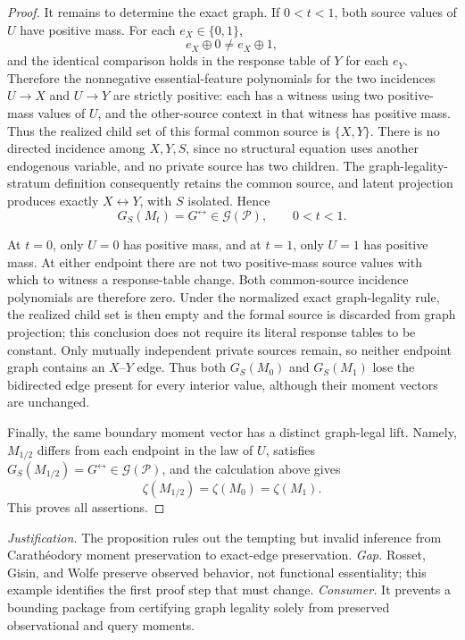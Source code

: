 \documentclass{article}
\begin{document}
\begin{proof}
It remains to determine the exact graph.  If \(0<t<1\), both source values of \(U\) have positive mass.  For each \(e_X\in\{0,1\}\),
\[
 e_X\oplus0\ne e_X\oplus1,
\]
and the identical comparison holds in the response table of \(Y\) for each \(e_Y\).  Therefore the nonnegative essential-feature polynomials for the two incidences \(U\to X\) and \(U\to Y\) are strictly positive: each has a witness using two positive-mass values of \(U\), and the other-source context in that witness has positive mass.  Thus the realized child set of this formal common source is \(\{X,Y\}\).  There is no directed incidence among \(X,Y,S\), since no structural equation uses another endogenous variable, and no private source has two children.  The graph-legality-stratum definition consequently retains the common source, and latent projection produces exactly \(X\leftrightarrow Y\), with \(S\) isolated.  Hence
\[
 G_S(M_t)=G^{\leftrightarrow}\in\mathcal G(\mathcal P),
 \qquad 0<t<1.
\]

At \(t=0\), only \(U=0\) has positive mass, and at \(t=1\), only \(U=1\) has positive mass.  At either endpoint there are not two positive-mass source values with which to witness a response-table change.  Both common-source incidence polynomials are therefore zero.  Under the normalized exact graph-legality rule, the realized child set is then empty and the formal source is discarded from graph projection; this conclusion does not require its literal response tables to be constant.  Only mutually independent private sources remain, so neither endpoint graph contains an \(X\)--\(Y\) edge.  Thus both \(G_S(M_0)\) and \(G_S(M_1)\) lose the bidirected edge present for every interior value, although their moment vectors are unchanged.

Finally, the same boundary moment vector has a distinct graph-legal lift.  Namely, \(M_{1/2}\) differs from each endpoint in the law of \(U\), satisfies \(G_S(M_{1/2})=G^{\leftrightarrow}\in\mathcal G(\mathcal P)\), and the calculation above gives
\[
 \zeta(M_{1/2})=\zeta(M_0)=\zeta(M_1).
\]
This proves all assertions.
\end{proof}
\par\smallskip\noindent \textit{Justification.} The proposition rules out the tempting but invalid inference from Carathéodory moment preservation to exact-edge preservation. \textit{Gap.} Rosset, Gisin, and Wolfe preserve observed behavior, not functional essentiality; this example identifies the first proof step that must change. \textit{Consumer.} It prevents a bounding package from certifying graph legality solely from preserved observational and query moments.
\end{document}
